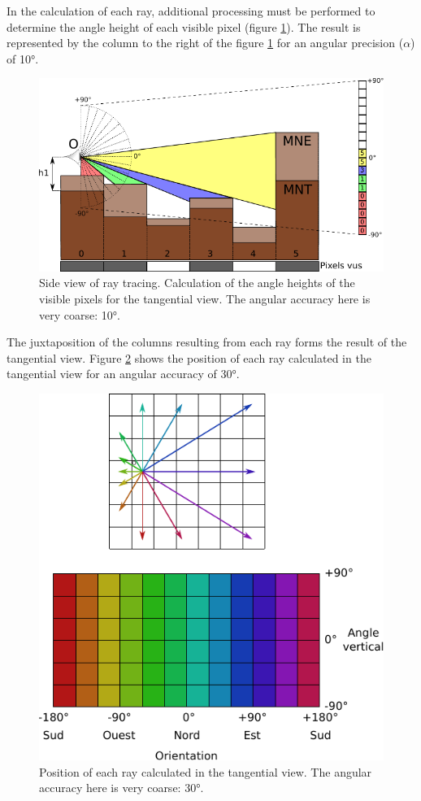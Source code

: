 \documentclass{report}
\begin{document}
In the calculation of each ray, additional processing must be performed to determine the angle height of each visible pixel (figure \ref{ray_side_tan}). The result is represented by the column to the right of the figure \ref{ray_side_tan} for an angular precision ($\alpha$) of 10°.

\begin{figure}[H]
	\includegraphics{img/ray_side_tan-fr.pdf} 
	\caption{Side view of ray tracing. Calculation of the angle heights of the visible pixels for the tangential view. The angular accuracy here is very coarse: 10°.}
	\label{ray_side_tan}
\end{figure}

The juxtaposition of the columns resulting from each ray forms the result of the tangential view. Figure \ref{grid_tan_result} shows the position of each ray calculated in the tangential view for an angular accuracy of 30°.

\begin{figure}[H]
	\includegraphics{img/grid_tan_result.pdf} 
	\caption{Position of each ray calculated in the tangential view. The angular accuracy here is very coarse: 30°.}
	\label{grid_tan_result}
\end{figure}
\end{document}
